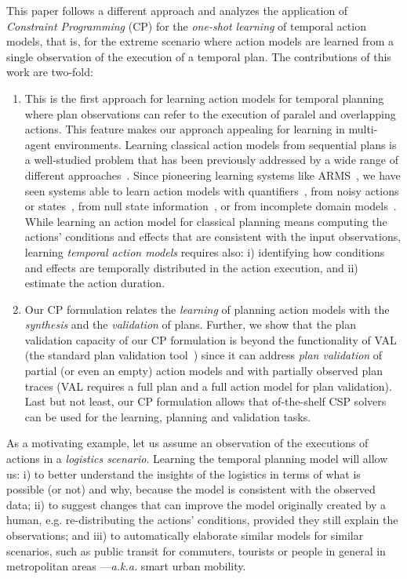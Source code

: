 \documentclass{ecai}
\begin{document}
This paper follows a different approach and analyzes the application of {\em Constraint Programming} (CP) for the {\em one-shot learning} of temporal action models, that is, for the extreme scenario where action models are learned from a single observation of the execution of a temporal plan. The contributions of this work are two-fold:
\begin{enumerate}  
\item This is the first approach for learning action models for temporal planning where plan observations can refer to the execution of paralel and overlapping actions. This feature makes our approach appealing for learning in multi-agent environments. Learning classical action models from sequential plans is a well-studied problem that has been previously addressed by a wide range of different approaches~\cite{arora2018review}. Since pioneering learning systems like ARMS~\cite{yang2007learning}, we have seen systems able to learn action models with quantifiers~\cite{AmirC08,ZhuoYHL10}, from noisy actions or states~\cite{MouraoZPS12,zhuo2013action}, from null state information~\cite{cresswell2013}, or from incomplete domain models~\cite{ZhuoK17,ZhuoNK13}. While learning an action model for classical planning means computing the actions' conditions and effects that are consistent with the input observations, learning {\em temporal action models} requires also: i) identifying how conditions and effects are temporally distributed in the action execution, and ii) estimate the action duration. 
\item Our CP formulation relates the {\em learning} of planning action models with the {\em synthesis} and the {\em validation} of plans. Further, we show that the plan validation capacity of our CP formulation is beyond the functionality of VAL (the standard plan validation tool~\cite{howey2004val}) since it can address {\em plan validation} of partial (or even an empty) action models and with partially observed plan traces (VAL requires a full plan and a full action model for plan validation). Last but not least, our CP formulation allows that of-the-shelf CSP solvers can be used for the learning, planning and validation tasks.  
\end{enumerate}

As a motivating example, let us assume an observation of the executions of actions in a {\em logistics scenario}. Learning the temporal planning model will allow us: i) to better understand the insights of the logistics in terms of what is possible (or not) and why, because the model is consistent with the observed data; ii) to suggest changes that can improve the model originally created by a human, e.g. re-distributing the actions' conditions, provided they still explain the observations; and iii) to automatically elaborate similar models for similar scenarios, such as public transit for commuters, tourists or people in general in metropolitan areas ---\emph{a.k.a.} smart urban mobility.
\end{document}
